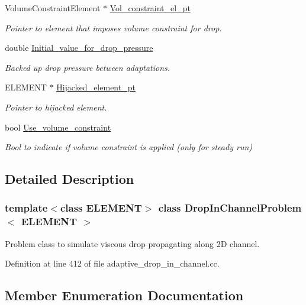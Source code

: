 \begin{DoxyCompactItemize}
Volume\+Constraint\+Element $\ast$ \hyperlink{classDropInChannelProblem_ac7476353270d83e26d60f817c371572c}{Vol\+\_\+constraint\+\_\+el\+\_\+pt}
\begin{DoxyCompactList}\small\item\em Pointer to element that imposes volume constraint for drop. \end{DoxyCompactList}\item 
double \hyperlink{classDropInChannelProblem_a0b54287d521735c003d32b71f4f925c3}{Initial\+\_\+value\+\_\+for\+\_\+drop\+\_\+pressure}
\begin{DoxyCompactList}\small\item\em Backed up drop pressure between adaptations. \end{DoxyCompactList}\item 
E\+L\+E\+M\+E\+NT $\ast$ \hyperlink{classDropInChannelProblem_af88997c3a40755063c21e4a95601600a}{Hijacked\+\_\+element\+\_\+pt}
\begin{DoxyCompactList}\small\item\em Pointer to hijacked element. \end{DoxyCompactList}\item 
bool \hyperlink{classDropInChannelProblem_aa555cfd96e802218280acd0165f974dd}{Use\+\_\+volume\+\_\+constraint}
\begin{DoxyCompactList}\small\item\em Bool to indicate if volume constraint is applied (only for steady run) \end{DoxyCompactList}\end{DoxyCompactItemize}


\subsection{Detailed Description}
\subsubsection*{template$<$class E\+L\+E\+M\+E\+NT$>$\newline
class Drop\+In\+Channel\+Problem$<$ E\+L\+E\+M\+E\+N\+T $>$}

Problem class to simulate viscous drop propagating along 2D channel. 

Definition at line 412 of file adaptive\+\_\+drop\+\_\+in\+\_\+channel.\+cc.



\subsection{Member Enumeration Documentation}
\mbox{\label{classDropInChannelProblem_a334e4cdb720696ffbc70724caf9b6dab}} 
